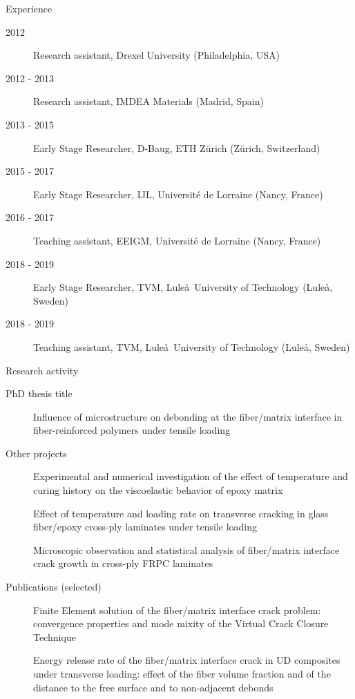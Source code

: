 \documentclass{beamer}
\begin{document}
\begin{frame}{Experience}
\small
\begin{description}
  \item[2012] Research assistant, Drexel University (Philadelphia, USA)
  \item[2012 - 2013] Research assistant, IMDEA Materials (Madrid, Spain)
  \item[2013 - 2015] Early Stage Researcher, D-Baug, ETH Z\"urich (Z\"urich, Switzerland)
  \item[2015 - 2017] Early Stage Researcher, IJL, Universit\'e de Lorraine (Nancy, France)
  \item[2016 - 2017] Teaching assistant, EEIGM, Universit\'e de Lorraine (Nancy, France)
  \item[2018 - 2019] Early Stage Researcher, TVM, Lule\aa\ University of Technology (Lule\aa, Sweden)
  \item[2018 - 2019] Teaching assistant, TVM, Lule\aa\ University of Technology (Lule\aa, Sweden)
\end{description}
\end{frame}

\begin{frame}{Research activity}
\footnotesize
\begin{description}
  \item[PhD thesis title] Influence of microstructure on debonding at the fiber/matrix interface in fiber-reinforced polymers under tensile loading
  \item[Other projects] Experimental and numerical investigation of the effect of temperature and curing history on the viscoelastic behavior of epoxy matrix
  \item[] Effect of temperature and loading rate on transverse cracking in glass fiber/epoxy cross-ply laminates under tensile loading
  \item[] Microscopic observation and statistical analysis of fiber/matrix interface crack growth in cross-ply FRPC laminates
  \item[Publications (selected)] Finite Element solution of the fiber/matrix interface crack problem: convergence properties and mode mixity of the Virtual Crack Closure Technique
  \item[] Energy release rate of the fiber/matrix interface crack in UD composites under transverse loading: effect of the fiber volume fraction and of the distance to the free surface and to non-adjacent debonds
\end{description}
\end{frame}
\end{document}

